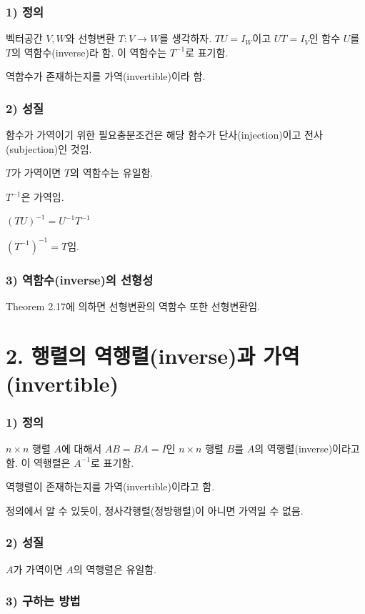 \documentclass[10pt, a4paper]{article}
\begin{document}
\subsubsection*{1) 정의}
벡터공간 $V,W$와 선형변환 $T:V \rightarrow W$를 생각하자. $TU=I_W$이고 $UT=I_V$인 함수 $U$를 $T$의 역함수(inverse)라 함. 이 역함수는 $T^{-1}$로 표기함.

역함수가 존재하는지를 가역(invertible)이라 함.

\subsubsection*{2) 성질}
함수가 가역이기 위한 필요충분조건은 해당 함수가 단사(injection)이고 전사(subjection)인 것임.

$T$가 가역이면 $T$의 역함수는 유일함.

$T^{-1}$은 가역임.

$(TU)^{-1}=U^{-1}T^{-1}$

$(T^{-1})^{-1}=T$임.

\subsubsection*{3) 역함수(inverse)의 선형성}
Theorem 2.17에 의하면 선형변환의 역함수 또한 선형변환임.\\


\section*{2. 행렬의 역행렬(inverse)과 가역(invertible)}
\subsubsection*{1) 정의}
$n \times n$ 행렬 $A$에 대해서 $AB=BA=I$인 $n \times n$ 행렬 $B$를 $A$의 역행렬(inverse)이라고 함. 이 역행렬은 $A^{-1}$로 표기함.

역행렬이 존재하는지를 가역(invertible)이라고 함.

정의에서 알 수 있듯이, 정사각행렬(정방행렬)이 아니면 가역일 수 없음.

\subsubsection*{2) 성질}
$A$가 가역이면 $A$의 역행렬은 유일함.

\subsubsection*{3) 구하는 방법}
\end{document}
